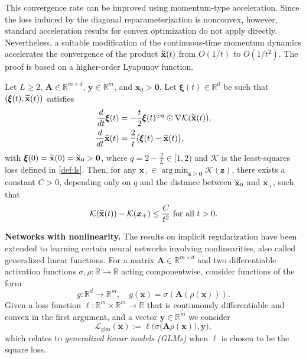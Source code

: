 \documentclass{svproc}
\newcommand{\bA}{\boldsymbol{A}}
\newcommand{\bx}{\boldsymbol{x}}
\newcommand{\by}{\boldsymbol{y}}
\newcommand{\bz}{\boldsymbol{z}}
\newcommand{\0}{\boldsymbol{0}}
\newcommand{\1}{\boldsymbol{1}}
\DeclareMathOperator*{\argmin}{arg\,min}
\renewcommand{\tilde}{\widetilde}
\def\R{\mathbb{R}}
\def\Lgl{\mathcal{L}_\text{glm}}
\def\xprod{\tilde{\bf x}}
\def\sigmainn{\rho}
\def\sigmaout{\sigma}
\def\tcont{{t}}
\begin{document}
This convergence rate can be improved using momentum-type acceleration. Since the loss induced by the diagonal reparameterization is nonconvex, however, standard acceleration results for convex optimization do not apply directly. Nevertheless, a suitable modification of the continuous-time momentum dynamics accelerates the convergence of the product $\xprod(\tcont)$ from $O(1/t)$ to $O(1/t^2)$. The proof is based on a higher-order Lyapunov function.

\begin{theorem}\label{thm:Accelerated}
Let $L\geq 2$, $\bA\in\mathbb{R}^{m\times d}$, $\by\in\mathbb{R}^{m}$, and $\bx_0>\0$. Let $\pmb{\xi}(\tcont)\in\mathbb{R}^d$ be such that $(\pmb{\xi}(\tcont),\xprod(\tcont))$ satisfies
\begin{equation*}%
\begin{aligned}
\frac{d}{d\tcont}\pmb{\xi}(\tcont)&=-\frac{\tcont}{2}\pmb{\xi}(\tcont)^{\odot q}\odot\nabla\mathcal{K}(\xprod(\tcont)),\\
\frac{d}{d\tcont}\xprod(\tcont)&=\frac{2}{\tcont}\bigl(\pmb{\xi}(\tcont)-\xprod(\tcont)\bigr),
\end{aligned}
\end{equation*}
with $\pmb{\xi}(0)=\xprod(0)=\xprod_0>\0$, where $q=2-\frac{2}{L}\in[1,2)$ and $\mathcal{K}$ is the least-squares loss defined in \eqref{def:ls}. Then, for any $\bx_+\in\argmin_{\bz\geq\0}\mathcal{K}(\bz)$, there exists a constant $C>0$, depending only on $q$ and the distance between $\xprod_0$ and $\bx_+$, such that
\begin{equation*}
\mathcal{K}(\xprod(\tcont))-\mathcal{K}(\bx_+)\leq\frac{C}{\tcont^2} \mbox{ for all } \tcont > 0.
\end{equation*}
\end{theorem}

\medskip



{\textbf{Networks with nonlinearity.}}
The results on implicit regularization have been extended \cite{chou2024induce} to learning certain neural networks involving nonlinearities, also called generalized linear functions. For a matrix $\bA \in \R^{m \times d}$ and two differentiable activation functions $\sigmaout,\sigmainn : \R \to \R$ acting componentwise, consider functions of the form
\[
g : \R^d \to \R^m, \quad g(\bx) = \sigmaout(\bA(\sigmainn(\bx))).
\]
Given a loss function $\ell: \R^m \times \R^m \to \R$ that is continuously differentiable and convex in the first argument, and a vector $\by \in \R^m$ we consider
\[
\Lgl(\bx):= \ell\Big( \sigmaout \big( \bA\sigmainn(\bx) \big), \by \Big),
\]
which relates to \emph{generalized linear models (GLMs)} \cite{dobson2018introduction} when $\ell$ is chosen to be the square loss.
\end{document}
